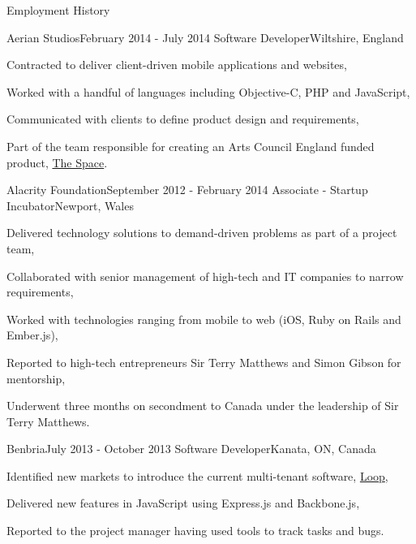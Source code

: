\documentclass{resume}
\begin{document}
\begin{rSection}{Employment History}
  \begin{rSubsection}{Aerian Studios}{February 2014 - July 2014}
    {Software Developer}{Wiltshire, England}
  \item Contracted to deliver client-driven mobile applications and websites,
  \item Worked with a handful of languages including Objective-C, PHP and
    JavaScript,
  \item Communicated with clients to define product design and requirements,
  \item Part of the team responsible for creating an Arts Council England
    funded product, \href{https://www.thespace.org/}{The Space}.
  \end{rSubsection}

  \begin{rSubsection}{Alacrity Foundation}{September 2012 - February 2014}
    {Associate - Startup Incubator}{Newport, Wales}
  \item Delivered technology solutions to demand-driven problems as part of a
    project team,
  \item Collaborated with senior management of high-tech and IT companies to
    narrow requirements,
  \item Worked with technologies ranging from mobile to web (iOS, Ruby on
    Rails and Ember.js),
  \item Reported to high-tech entrepreneurs Sir Terry Matthews and Simon Gibson
    for mentorship,
  \item Underwent three months on secondment to Canada under the leadership of
    Sir Terry Matthews.
  \end{rSubsection}

  \begin{rSubsection}{Benbria}{July 2013 - October 2013}
    {Software Developer}{Kanata, ON, Canada}
  \item Identified new markets to introduce the current multi-tenant software,
    \href{http://www.benbria.com/}{Loop},
  \item Delivered new features in JavaScript using Express.js and Backbone.js,
  \item Reported to the project manager having used tools to track tasks and
    bugs.
  \end{rSubsection}
\end{rSection}

\end{document}
